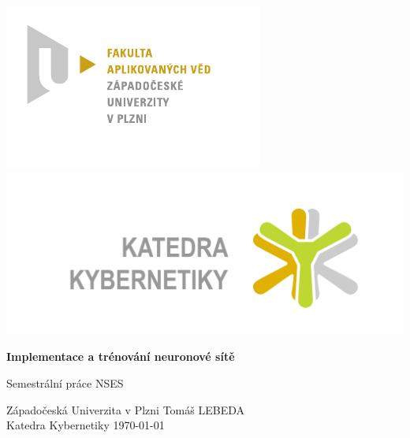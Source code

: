 \includegraphics{./src/imgs/FAV_logo}
\hfill
\includegraphics[scale=0.4]{./src/imgs/KKY_logo}

\vspace{7cm}

\begin{center}

	\begin{Huge}
		\textbf{Implementace a trénování neuronové sítě}
	\end{Huge}

	\vspace{5mm}

	\begin{Large}
		Semestrální práce NSES
	\end{Large}

\end{center}
\vfill
\noindent
Západočeská Univerzita v Plzni \hfill Tomáš LEBEDA\\
Katedra Kybernetiky \hfill \today\thispagestyle{empty}%
